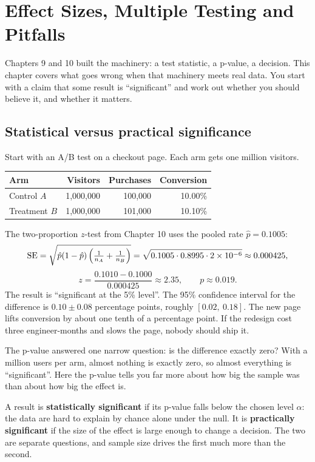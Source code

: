 \chapter{Effect Sizes, Multiple Testing and Pitfalls}
\label{ch:pitfalls}

Chapters 9 and 10 built the machinery: a test statistic, a p-value, a decision.
This chapter covers what goes wrong when that machinery meets real data. You start with a claim that
some result is ``significant'' and work out whether you should believe
it, and whether it matters.

\section{Statistical versus practical significance}
\label{sec:pitfalls-practical}

Start with an A/B test on a checkout page. Each arm gets one million visitors.

\begin{center}
\begin{tabular}{lrrr}
\toprule
Arm & Visitors & Purchases & Conversion \\
\midrule
Control $A$ & 1{,}000{,}000 & 100{,}000 & 10.00\% \\
Treatment $B$ & 1{,}000{,}000 & 101{,}000 & 10.10\% \\
\bottomrule
\end{tabular}
\end{center}

The two-proportion $z$-test from Chapter 10 uses the pooled rate
$\hat p = 0.1005$:
\[
  \operatorname{SE} = \sqrt{\hat p(1-\hat p)\left(\tfrac{1}{n_A}+\tfrac{1}{n_B}\right)}
      = \sqrt{0.1005\cdot 0.8995\cdot 2\times 10^{-6}} \approx 0.000425,
\]
\[
  z = \frac{0.1010-0.1000}{0.000425} \approx 2.35,
  \qquad p \approx 0.019.
\]
The result is ``significant at the 5\% level''. The 95\% confidence interval for
the difference is $0.10 \pm 0.08$ percentage points, roughly $[0.02,\ 0.18]$.
The new page lifts conversion by about one tenth of a percentage point. If the
redesign cost three engineer-months and slows the page, nobody should ship it.

The p-value answered one narrow question: is the difference exactly zero? With a
million users per arm, almost nothing is exactly zero, so almost everything is
``significant''. Here the p-value tells you far more about how big the sample was
than about how big the effect is.

\begin{definition}
A result is \textbf{statistically significant} if its p-value falls below the
chosen level $\alpha$: the data are hard to explain by chance alone under the null.
It is \textbf{practically significant} if the size of the effect is large enough to
change a decision. The two are separate questions, and sample size drives the
first much more than the second.
\end{definition}

